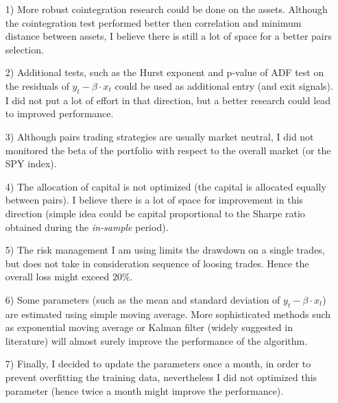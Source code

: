 \documentclass{paper}
\begin{document}
\begin{itemize}
\item[1)] More robust cointegration research could be done on the assets. Although the cointegration test performed better then correlation and minimum distance between assets, I believe there is still a lot of space for a better pairs selection.

\item[2)] Additional tests, such as the Hurst exponent and p-value of ADF test on the residuals of $y_t - \beta \cdot x_t$ could be used as additional entry (and exit signals). I did not put a lot of effort in that direction, but a better research could lead to improved performance.

\item[3)] Although pairs trading strategies are usually market neutral, I did not monitored the beta of the portfolio with respect to the overall market (or the SPY index).

\item[4)] The allocation of capital is not optimized (the capital is allocated equally between pairs). I believe there is a lot of space for improvement in this direction (simple idea could be capital proportional to the Sharpe ratio obtained during the \textit{in-sample} period).

\item[5)] The risk management I am using limits the drawdown on a single trades, but does not take in consideration sequence of loosing trades. Hence the overall loss might exceed $20\%.$

\item[6)] Some parameters (such as the mean and standard deviation of $y_t - \beta \cdot x_t$) are estimated using simple moving average. More sophisticated methods such as exponential moving average or Kalman filter (widely suggested in literature) will almost surely improve the performance of the algorithm.

\item[7)] Finally, I decided to update the parameters once a month, in order to prevent overfitting the training data, nevertheless I did not optimized this parameter (hence twice a month might improve the performance).
\end{itemize}
\end{document}

